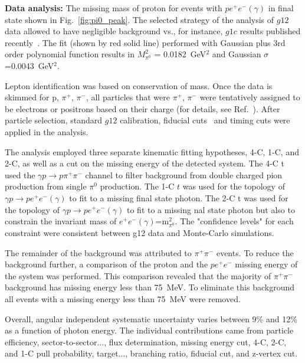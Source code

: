 \documentclass[aps,prc,twocolumn,floatfix,showpacs,preprintnumbers,amsmath,amssymb,superscriptaddress]{revtex4-1}
\begin{document}
\textbf{Data analysis:} The missing mass of proton for events 
with $pe^+e^-(\gamma)$ in final state shown in 
Fig.~\ref{fig:pi0_peak}. The selected strategy of the analysis
of $g12$ data allowed to have negligible background vs., for 
instance, $g1c$ results published recently~\cite{du07}.  The 
fit (shown by red solid line) performed with Gaussian plus 3rd 
order polynomial function results in $M_{\pi^0}^2$ = 
0.0182~GeV$^2$ and Gaussian $\sigma$=0.0043~GeV$^2$. 

Lepton identification was based on conservation of mass. Once 
the data is skimmed for p, $\pi^+$, $\pi^-$, all particles that 
were $\pi^+$, $\pi^-$ were tentatively assigned to be electrons 
or positrons based on their charge (for details, see 
Ref.~\cite{Kunkel}).  After particle selection, standard $g12$ 
calibration, fiducial cuts~\cite{Akbar} and timing cuts were 
applied in the analysis.

The analysis employed three separate kinematic fitting 
hypotheses, 4-C, 1-C, and 2-C, as well as a cut on the missing 
energy of the detected system. The 4-C t used the $\gamma p\to 
p\pi^+\pi^-$ channel to filter background from double charged 
pion production from single $\pi^0$ production. The 1-C $t$ 
was used for the topology of $\gamma p\to pe^+e^-(\gamma)$ to 
fit to a missing final state photon.  The 2-C t was used for 
the topology of $\gamma p\to pe^+e^-(\gamma)$ to fit to a 
missing nal state photon but also to constrain the invariant 
mass of $e^+e^-(\gamma)$=m$^2_{\pi^0}$. The "confidence 
levels" for each constraint were consistent between g12 data 
and Monte-Carlo simulations.

The remainder of the background was attributed to $\pi^+\pi^-$
events. To reduce the background further, a comparison of the 
proton and the $pe^+e^-$ missing energy of the system was 
performed. This comparison revealed that the majority of
$\pi^+\pi^-$ background has missing energy less than 75~MeV. 
To eliminate this background all events with a missing energy 
less than 75~MeV were removed.

Overall, angular independent systematic uncertainty varies 
between 9\% and 12\% as a function of photon energy. The 
individual contributions came from particle efficiency, 
sector-to-sector..., flux determination, missing energy cut, 
4-C, 2-C, and 1-C pull probability, target..., branching 
ratio, fiducial cut, and z-vertex cut.
\end{document}
